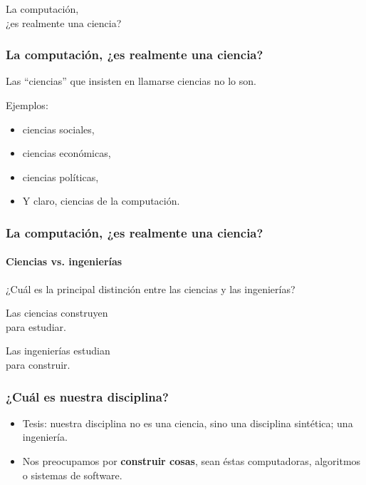 \documentclass[spanish]{beamer}
\begin{document}
\begin{frame}
  \begin{center}
    \Huge{
      La computación,\\
      ¿es realmente una ciencia?
    }
  \end{center}
\end{frame}

\begin{frame}
  \frametitle{La computación, ¿es realmente una ciencia?}

  Las ``ciencias'' que insisten en llamarse ciencias no lo son.

  \pause

  Ejemplos:

  \pause

  \begin{itemize}
    \item ciencias sociales, \pause
    \item ciencias económicas, \pause
    \item ciencias políticas, \pause
    \item Y claro, ciencias de la computación.
  \end{itemize}
\end{frame}

\begin{frame}
  \frametitle{La computación, ¿es realmente una ciencia?}
  \framesubtitle{Ciencias vs. ingenierías}

  \pause

  ¿Cuál es la principal distinción entre las ciencias y las ingenierías?
\end{frame}

\begin{frame}
  \begin{center}
    \Huge{
      Las ciencias construyen \\
      para estudiar.

      \vspace{2em}

      Las ingenierías estudian \\
      para construir.
    }
  \end{center}
\end{frame}

\begin{frame}
  \frametitle{¿Cuál es nuestra disciplina?}

  \pause

  \begin{itemize}
    \item Tesis: nuestra disciplina no es una ciencia, sino una disciplina
      sintética; una ingeniería.
    \pause

    \item Nos preocupamos por \textbf{construir cosas}, sean éstas
      computadoras, algoritmos o sistemas de software.
  \end{itemize}
\end{frame}
\end{document}
